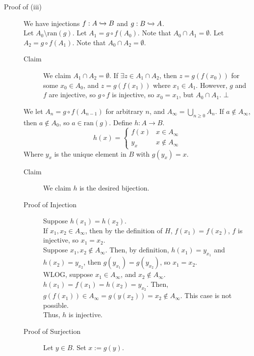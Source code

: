 \documentclass[10pt]{extarticle}
\begin{document}
      \begin{description}
        \item[Proof of (iii)] We have injections $f: A\xhookrightarrow{}B$ and $g:B\xhookrightarrow{} A$.\\

          Let $A_0 \setminus \text{ran}(g)$. Let $A_1 = g\circ f(A_0)$. Note that $A_0 \cap A_1 = \emptyset$. Let $A_2 = g\circ f(A_1)$. Note that $A_0\cap A_2 =\emptyset$.
          \begin{description}
            \item[Claim] We claim $A_1 \cap A_2 = \emptyset$. If $\exists z\in A_1\cap A_2$, then $z = g(f(x_0))$ for some $x_0 \in A_0$, and $z = g(f(x_1))$ where $x_1\in A_1$. However, $g$ and $f$ are injective, so $g\circ f$ is injective, so $x_0 = x_1$, but $A_0\cap A_1$. $\bot$
          \end{description}
          We let $A_n = g\circ f(A_{n-1})$ for arbitrary $n$, and $A_{\infty} = \bigcup_{n\geq 0} A_n$. If $a\notin A_{\infty}$, then $a\notin A_0$, so $a\in \text{ran}(g)$. Define $h: A\rightarrow B$.
          \[
            h(x) = \begin{cases}
              f(x) & x\in A_{\infty}\\
              y_x & x\notin A_{\infty}
            \end{cases}
          \] 
          Where $y_x$ is the unique element in $B$ with $g(y_x) = x$.
          \begin{description}
            \item[Claim] We claim $h$ is the desired bijection.
            \item[Proof of Injection] Suppose $h(x_1) = h(x_2)$.\\

              If $x_1,x_2\in A_{\infty}$, then by the definition of $H$, $f(x_1) = f(x_2)$, $f$ is injective, so $x_1 = x_2$.\\

              Suppose $x_1,x_2\notin A_{\infty}$. Then, by definition, $h(x_1) = y_{x_1}$ and $h(x_2) = y_{x_2}$, then $g(y_{x_1}) = g(y_{x_2})$, so $x_1 = x_2$.\\

              WLOG, suppose $x_1\in A_{\infty}$, and $x_2 \notin A_{\infty}$. $h(x_1) = f(x_1) = h(x_2) = y_{x_2}$. Then, $g(f(x_1))\in A_{\infty} = g(y(x_2)) = x_2\notin A_{\infty}$. This case is not possible.\\

              Thus, $h$ is injective.
            \item[Proof of Surjection] Let $y\in B$. Set $x := g(y)$.\\


\end{description}
\end{description}
\end{document}
